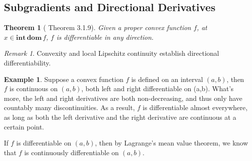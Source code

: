 \documentclass[openany]{book}
\newtheorem{theorem}{Theorem}[chapter]
\theoremstyle{definition}
\newtheorem{example}{Example}[chapter]
\theoremstyle{remark}
\newtheorem*{remark}{Remark}
\begin{document}
\subsection{Subgradients and Directional Derivatives}
\begin{theorem}[\cite{N13} Theorem 3.1.9]\label{convCont}
    Given a proper convex function $f$, at $x\in \mathbf{int}\,\mathbf{dom}\,f$, $f$ is differentiable in any direction.
\end{theorem}
\begin{remark}
    Convexity and local Lipschitz continuity establish directional differentiability.
\end{remark}
\begin{example}\label{1dConv}
    Suppose a convex function $f$ is defined on an interval $(a,b)$, then $f$ is continuous on $(a,b)$, both left and right differentiable on (a,b). What's more, the left and right derivatives are both non-decreasing, and thus only have countably many discontinuities. As a result, $f$ is differentiable almost everywhere, as long as both the left derivative and the right derivative are continuous at a certain point.

    If $f$ is differentiable on $(a,b)$, then by Lagrange's mean value theorem, we know that $f$ is continuously differentiable on $(a,b)$.
\end{example}
\end{document}
